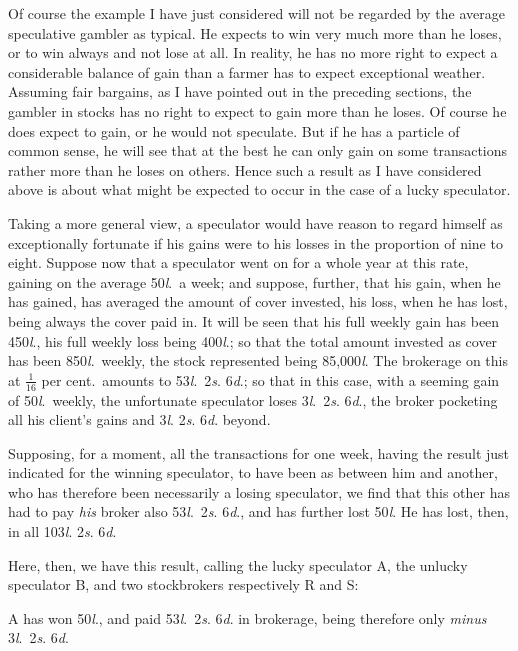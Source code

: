 \documentclass[letterpaper,12pt,oneside,openany]{memoir}
\begin{document}
Of course the example I have just considered will
not be regarded by the average speculative gambler as
typical. He expects to win very much more than he
loses, or to win always and not lose at all. In reality,
he has no more right to expect a considerable balance
of gain than a farmer has to expect exceptional weather.
Assuming fair bargains, as I have pointed out in
the preceding sections, the gambler in stocks has
no right to expect to gain more than he loses. Of
course he does expect to gain, or he would not speculate.
But if he has a particle of common sense, he
will see that at the best he can only gain on some
transactions rather more than he loses on others.
Hence such a result as I have considered above is
about what might be expected to occur in the case
of a lucky speculator.

Taking a more general view, a speculator would have
reason to regard himself as exceptionally fortunate if his
gains were to his losses in the proportion of nine to
eight. Suppose now that a speculator went on for a
whole year at this rate, gaining on the average 50\textit{l}.\ a
week; and suppose, further, that his gain, when he has
gained, has averaged the amount of cover invested, his
loss, when he has lost, being always the cover paid in.
It will be seen that his full weekly gain has been 450\textit{l}.,
his full weekly loss being 400\textit{l}.; so that the total
amount invested as cover has been 850\textit{l}.\ weekly, the
stock represented being 85,000\textit{l}. The brokerage on
this at $\frac{1}{16}$ per cent.\ amounts to 53\textit{l}.\ 2\textit{s}. 6\textit{d}.; so that in
this case, with a seeming gain of 50\textit{l}.\ weekly, the unfortunate
speculator loses 3\textit{l}.\  2\textit{s}. 6\textit{d}., the broker pocketing all his client's
gains and 3\textit{l}. 2\textit{s}. 6\textit{d}. beyond.

Supposing, for a moment, all the transactions for
one week, having the result just indicated for the winning
speculator, to have been as between him and another,
who has therefore been necessarily a losing speculator,
we find that this other has had to pay \emph{his} broker also
53\textit{l}.\ 2\textit{s}. 6\textit{d}., and has further lost 50\textit{l}. He has lost, then,
in all 103\textit{l}. 2\textit{s}. 6\textit{d}.

Here, then, we have this result, calling the lucky
speculator A, the unlucky speculator B, and two stockbrokers
respectively R and S:

A has won 50\textit{l}., and paid 53\textit{l}.\ 2\textit{s}. 6\textit{d}. in brokerage,
being therefore only \emph{minus} 3\textit{l}.\ 2\textit{s}. 6\textit{d}.
\end{document}
